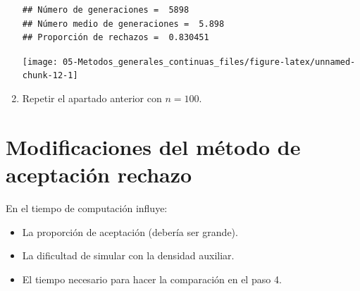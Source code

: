 \documentclass[
]{book}
\newenvironment{Shaded}{\begin{snugshade}}{\end{snugshade}}
\newcommand{\CommentTok}[1]{\textcolor[rgb]{0.56,0.35,0.01}{\textit{#1}}}
\newcommand{\DataTypeTok}[1]{\textcolor[rgb]{0.13,0.29,0.53}{#1}}
\newcommand{\DecValTok}[1]{\textcolor[rgb]{0.00,0.00,0.81}{#1}}
\newcommand{\FloatTok}[1]{\textcolor[rgb]{0.00,0.00,0.81}{#1}}
\newcommand{\KeywordTok}[1]{\textcolor[rgb]{0.13,0.29,0.53}{\textbf{#1}}}
\newcommand{\NormalTok}[1]{#1}
\newcommand{\OtherTok}[1]{\textcolor[rgb]{0.56,0.35,0.01}{#1}}
\newcommand{\StringTok}[1]{\textcolor[rgb]{0.31,0.60,0.02}{#1}}
\theoremstyle{break}
\theoremstyle{definition}
\theoremstyle{definition}
\theoremstyle{definition}
\theoremstyle{remark}
\begin{document}
\begin{enumerate}
\begin{verbatim}
## Número de generaciones =  5898
## Número medio de generaciones =  5.898
## Proporción de rechazos =  0.830451
\end{verbatim}

\begin{Shaded}
\end{Shaded}

  \begin{center}\texttt{[image: 05-Metodos\_generales\_continuas\_files/figure-latex/unnamed-chunk-12-1]} \end{center}
\item
  Repetir el apartado anterior con \(n=100\).
\end{enumerate}

\hypertarget{modificaciones-del-muxe9todo-de-aceptaciuxf3n-rechazo}{%
\section{Modificaciones del método de aceptación rechazo}\label{modificaciones-del-muxe9todo-de-aceptaciuxf3n-rechazo}}

En el tiempo de computación influye:

\begin{itemize}
\item
  La proporción de aceptación (debería ser grande).
\item
  La dificultad de simular con la densidad auxiliar.
\item
  El tiempo necesario para hacer la comparación en el paso 4.
\end{itemize}
\end{document}
